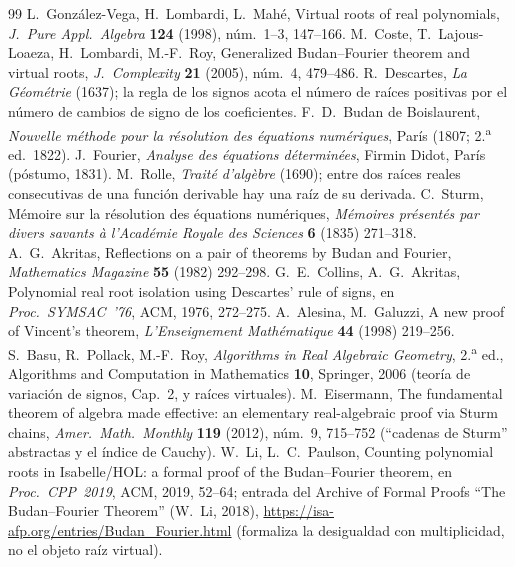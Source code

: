\documentclass[11pt]{article}
\begin{document}
\begin{thebibliography}{99}\small
{} L.~Gonz\'alez-Vega, H.~Lombardi, L.~Mah\'e, Virtual roots of real polynomials,
\emph{J.~Pure Appl.\ Algebra} \textbf{124} (1998), n\'um.~1--3, 147--166.
 M.~Coste, T.~Lajous-Loaeza, H.~Lombardi, M.-F.~Roy, Generalized Budan--Fourier theorem
and virtual roots, \emph{J.~Complexity} \textbf{21} (2005), n\'um.~4, 479--486.
 R.~Descartes, \emph{La G\'eom\'etrie} (1637); la regla de los signos acota el
n\'umero de ra\'ices positivas por el n\'umero de cambios de signo de los coeficientes.
 F.~D.~Budan de Boislaurent, \emph{Nouvelle m\'ethode pour la r\'esolution des
\'equations num\'eriques}, Par\'is (1807; 2.\textsuperscript{a} ed.\ 1822).
 J.~Fourier, \emph{Analyse des \'equations d\'etermin\'ees}, Firmin Didot, Par\'is
(p\'ostumo, 1831).
 M.~Rolle, \emph{Trait\'e d'alg\`ebre} (1690); entre dos ra\'ices reales consecutivas de
una funci\'on derivable hay una ra\'iz de su derivada.
 C.~Sturm, M\'emoire sur la r\'esolution des \'equations num\'eriques, \emph{M\'emoires
pr\'esent\'es par divers savants \`a l'Acad\'emie Royale des Sciences} \textbf{6} (1835) 271--318.
 A.~G.~Akritas, Reflections on a pair of theorems by Budan and Fourier, \emph{Mathematics
Magazine} \textbf{55} (1982) 292--298.
 G.~E.~Collins, A.~G.~Akritas, Polynomial real root isolation using Descartes'
rule of signs, en \emph{Proc.\ SYMSAC~'76}, ACM, 1976, 272--275.
 A.~Alesina, M.~Galuzzi, A new proof of Vincent's theorem, \emph{L'Enseignement
Math\'ematique} \textbf{44} (1998) 219--256.
 S.~Basu, R.~Pollack, M.-F.~Roy, \emph{Algorithms in Real Algebraic Geometry}, 2.\textsuperscript{a}
ed., Algorithms and Computation in Mathematics \textbf{10}, Springer, 2006 (teor\'ia de variaci\'on de
signos, Cap.~2, y ra\'ices virtuales).
 M.~Eisermann, The fundamental theorem of algebra made effective: an elementary
real-algebraic proof via Sturm chains, \emph{Amer.\ Math.\ Monthly} \textbf{119} (2012), n\'um.~9,
715--752 (``cadenas de Sturm'' abstractas y el \'indice de Cauchy).
 W.~Li, L.~C.~Paulson, Counting polynomial roots in Isabelle/HOL: a formal proof of the
Budan--Fourier theorem, en \emph{Proc.\ CPP~2019}, ACM, 2019, 52--64; entrada del Archive of Formal
Proofs ``The Budan--Fourier Theorem'' (W.~Li, 2018),
\url{https://isa-afp.org/entries/Budan_Fourier.html} (formaliza la desigualdad con multiplicidad, no el
objeto ra\'iz virtual).

\end{thebibliography}
\end{document}
